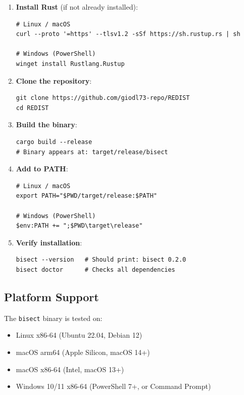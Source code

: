 \begin{enumerate}[leftmargin=*, itemsep=4pt]

  \item \textbf{Install Rust} (if not already installed):
\begin{verbatim}
# Linux / macOS
curl --proto '=https' --tlsv1.2 -sSf https://sh.rustup.rs | sh

# Windows (PowerShell)
winget install Rustlang.Rustup
\end{verbatim}

  \item \textbf{Clone the repository}:
\begin{verbatim}
git clone https://github.com/giodl73-repo/REDIST
cd REDIST
\end{verbatim}

  \item \textbf{Build the binary}:
\begin{verbatim}
cargo build --release
# Binary appears at: target/release/bisect
\end{verbatim}

  \item \textbf{Add to PATH}:
\begin{verbatim}
# Linux / macOS
export PATH="$PWD/target/release:$PATH"

# Windows (PowerShell)
$env:PATH += ";$PWD\target\release"
\end{verbatim}

  \item \textbf{Verify installation}:
\begin{verbatim}
bisect --version   # Should print: bisect 0.2.0
bisect doctor      # Checks all dependencies
\end{verbatim}

\end{enumerate}

\subsection*{Platform Support}

The \texttt{bisect} binary is tested on:
\begin{itemize}[itemsep=2pt]
  \item Linux x86-64 (Ubuntu 22.04, Debian 12)
  \item macOS arm64 (Apple Silicon, macOS 14+)
  \item macOS x86-64 (Intel, macOS 13+)
  \item Windows 10/11 x86-64 (PowerShell 7+, or Command Prompt)
\end{itemize}


